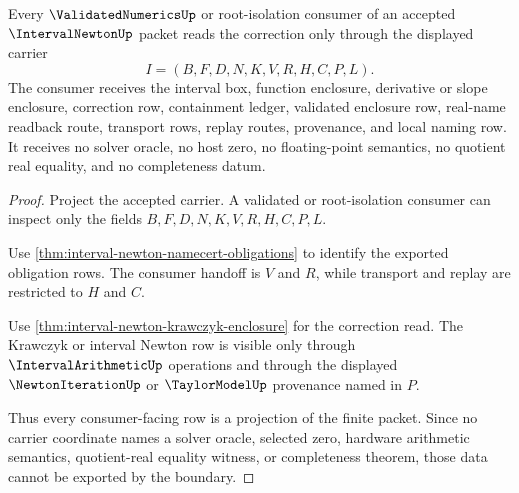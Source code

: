\begin{theorem}
\label{thm:interval-newton-validated-consumer-boundary}
Every $\ValidatedNumericsUp$ or root-isolation consumer of an accepted $\IntervalNewtonUp$ packet reads the correction only through the displayed carrier
$$
I=(B,F,D,N,K,V,R,H,C,P,L).
$$
The consumer receives the interval box, function enclosure, derivative or slope enclosure, correction row, containment ledger, validated enclosure row, real-name readback route, transport rows, replay routes, provenance, and local naming row. It receives no solver oracle, no host zero, no floating-point semantics, no quotient real equality, and no completeness datum.
\end{theorem}
\begin{proof}
Project the accepted carrier. A validated or root-isolation consumer can inspect only the fields $B,F,D,N,K,V,R,H,C,P,L$.

Use \autoref{thm:interval-newton-namecert-obligations} to identify the exported obligation rows. The consumer handoff is $V$ and $R$, while transport and replay are restricted to $H$ and $C$.

Use \autoref{thm:interval-newton-krawczyk-enclosure} for the correction read. The Krawczyk or interval Newton row is visible only through $\IntervalArithmeticUp$ operations and through the displayed $\NewtonIterationUp$ or $\TaylorModelUp$ provenance named in $P$.

Thus every consumer-facing row is a projection of the finite packet. Since no carrier coordinate names a solver oracle, selected zero, hardware arithmetic semantics, quotient-real equality witness, or completeness theorem, those data cannot be exported by the boundary.
\end{proof}

